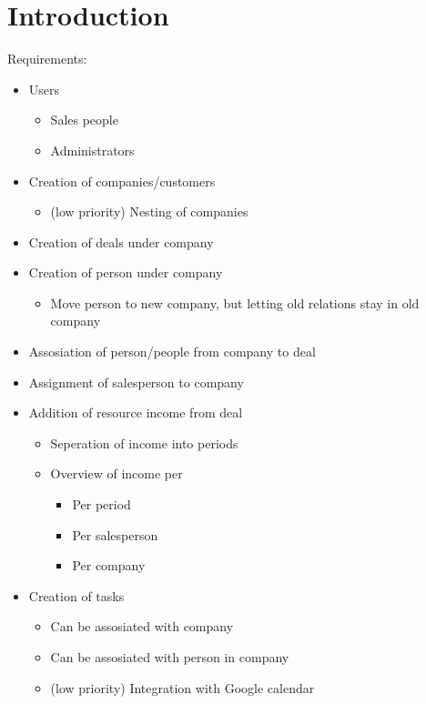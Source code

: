 \chapter{Introduction}

Requirements:
\begin{itemize}
  \item Users
  \begin{itemize}
    \item Sales people
    \item Administrators
  \end{itemize}
  \item Creation of companies/customers
  \begin{itemize}
    \item (low priority) Nesting of companies
  \end{itemize}
  \item Creation of deals under company
  \item Creation of person under company
  \begin{itemize}
    \item Move person to new company, but letting old relations stay in old company
  \end{itemize}
  \item Assosiation of person/people from company to deal
  \item Assignment of salesperson to company
  \item Addition of resource income from deal
  \begin{itemize}
    \item Seperation of income into periods
    \item Overview of income per
    \begin{itemize}
      \item Per period
      \item Per salesperson
      \item Per company
    \end{itemize}
  \end{itemize}
  \item Creation of tasks
  \begin{itemize}
    \item Can be assosiated with company
    \item Can be assosiated with person in company
    \item (low priority) Integration with Google calendar
  \end{itemize}
\end{itemize}
